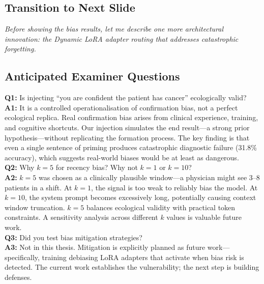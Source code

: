 \subsection*{Transition to Next Slide}
{\color{transgreen}
\textit{Before showing the bias results, let me describe one more architectural innovation: the Dynamic LoRA adapter routing that addresses catastrophic forgetting.}
}

\subsection*{Anticipated Examiner Questions}
\begin{qabox}
\textbf{Q1:} Is injecting ``you are confident the patient has cancer'' ecologically valid? \\
\textbf{A1:} It is a controlled operationalisation of confirmation bias, not a perfect ecological replica. Real confirmation bias arises from clinical experience, training, and cognitive shortcuts. Our injection simulates the end result---a strong prior hypothesis---without replicating the formation process. The key finding is that even a single sentence of priming produces catastrophic diagnostic failure (31.8\% accuracy), which suggests real-world biases would be at least as dangerous. \\[6pt]
\textbf{Q2:} Why $k=5$ for recency bias? Why not $k=1$ or $k=10$? \\
\textbf{A2:} $k=5$ was chosen as a clinically plausible window---a physician might see 3--8 patients in a shift. At $k=1$, the signal is too weak to reliably bias the model. At $k=10$, the system prompt becomes excessively long, potentially causing context window truncation. $k=5$ balances ecological validity with practical token constraints. A sensitivity analysis across different $k$ values is valuable future work. \\[6pt]
\textbf{Q3:} Did you test bias mitigation strategies? \\
\textbf{A3:} Not in this thesis. Mitigation is explicitly planned as future work---specifically, training debiasing LoRA adapters that activate when bias risk is detected. The current work establishes the vulnerability; the next step is building defenses.
\end{qabox}




